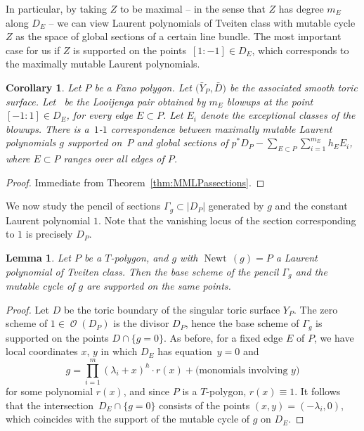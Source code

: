 \documentclass[pdftex]{sigma}
\numberwithin{equation}{section}
\newtheorem{Corollary}[Theorem]{Corollary}
\newtheorem{Lemma}[Theorem]{Lemma}
\DeclareMathOperator{\Newt}{{Newt \,}}
\DeclareMathOperator{\cO}{\mathcal{O}}
\begin{document}
In particular, by taking $Z$ to be maximal -- in the sense that $Z$ has degree $m_E$ along $D_E$ -- we can view Laurent polynomials of Tveiten class with mutable cycle $Z$ as the space of global sections of a certain line bundle. The most important case for us if $Z$ is supported on the points~${[1:-1] \in D_E}$, which corresponds to the maximally mutable Laurent polynomials.
	\begin{Corollary}
		Let $P$ be a Fano polygon. Let $\bigl(\bar{Y}_P, \bar{D}\bigr)$ be the associated smooth toric surface. Let~ be the Looijenga pair obtained by $m_E$ blowups at the point ${[-1:1] \in D_E}$, for every edge $E \subset P$. Let $E_i$ denote the exceptional classes of the blowups. There is a~$1$-$1$ correspondence between maximally mutable Laurent polynomials $g$ supported on~$P$ and global sections of
$p^*D_P-\sum_{E \subset P}\sum_{i=1}^{m_E} h_E E_i$,
		where $E \subset P$ ranges over all edges of $P$.
	\end{Corollary}
\begin{proof}
	Immediate from Theorem~\ref{thm:MMLPassections}.
\end{proof}

We now study the pencil of sections $\Gamma_g \subset |D_P|$ generated by $g$ and the constant Laurent polynomial $1$. Note that the vanishing locus of the section corresponding to $1$ is precisely $D_P$.
\begin{Lemma}\label{lem:baseschemevsmutablecycle}
	Let $P$ be a $T$-polygon, and $g$ with $\Newt(g)=P$ a Laurent polynomial of Tveiten class. Then the base scheme of the pencil $\Gamma_g$ and the mutable cycle of $g$ are supported on the same points.
\end{Lemma}
\begin{proof}
	Let $D$ be the toric boundary of the singular toric surface $Y_P$. The zero scheme of ${1 \in \cO(D_P)}$ is the divisor $D_P$, hence the base scheme of $\Gamma_g$ is supported on the points $D \cap \{g=0\}$. As before, for a fixed edge $E$ of $P$, we have local coordinates $x$, $y$ in which $D_E$ has equation~${y=0}$ and
	\[
	g=\prod_{i=1}^{m} (\lambda_i + x)^{h} \cdot r(x) +\text{(monomials involving $y$)}
	\]
	for some polynomial $r(x)$, and since $P$ is a $T$-polygon, $r(x) \equiv 1$. It follows that the intersection~${D_E \cap \{g=0\}}$ consists of the points $(x, y)=(-\lambda_i, 0)$, which coincides with the support of the mutable cycle of $g$ on $D_E$.
\end{proof}
\end{document}
